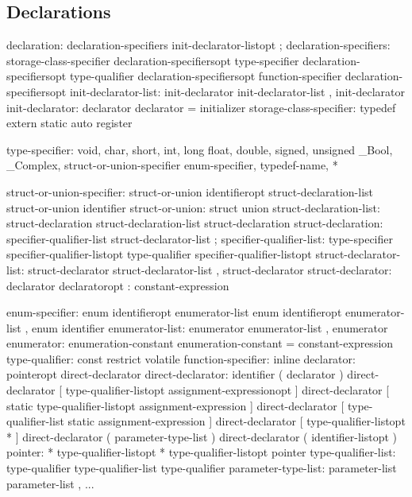 \subsection{Declarations}\label{chap:decl}
\begin{code_files}
declaration:
	declaration-specifiers init-declarator-listopt ;
declaration-specifiers:
	storage-class-specifier declaration-specifiersopt
	type-specifier declaration-specifiersopt
	type-qualifier declaration-specifiersopt
	function-specifier declaration-specifiersopt
init-declarator-list:
	init-declarator
	init-declarator-list , init-declarator
init-declarator:
	declarator
	declarator = initializer
storage-class-specifier:
	typedef
	extern
	static
	auto
	register

type-specifier:
	void, char, short, int, long
	float, double, signed, unsigned
	_Bool, _Complex, struct-or-union-specifier
	enum-specifier, typedef-name, *

struct-or-union-specifier:
	struct-or-union identifieropt { struct-declaration-list }
	struct-or-union identifier
struct-or-union:
	struct
	union
struct-declaration-list:
	struct-declaration
	struct-declaration-list struct-declaration
struct-declaration:
	specifier-qualifier-list struct-declarator-list ;
specifier-qualifier-list:
	type-specifier specifier-qualifier-listopt
	type-qualifier specifier-qualifier-listopt
struct-declarator-list:
	struct-declarator
	struct-declarator-list , struct-declarator
struct-declarator:
	declarator
	declaratoropt : constant-expression

enum-specifier:
	enum identifieropt { enumerator-list }
	enum identifieropt { enumerator-list , }
	enum identifier
enumerator-list:
	enumerator
	enumerator-list , enumerator
enumerator:
	enumeration-constant
	enumeration-constant = constant-expression
type-qualifier:
	const
	restrict
	volatile
function-specifier:
	inline
declarator:
	pointeropt direct-declarator
direct-declarator:
	identifier
	( declarator )
	direct-declarator [ type-qualifier-listopt assignment-expressionopt ]
	direct-declarator [ static type-qualifier-listopt assignment-expression ]
	direct-declarator [ type-qualifier-list static assignment-expression ]
	direct-declarator [ type-qualifier-listopt * ]
	direct-declarator ( parameter-type-list )
	direct-declarator ( identifier-listopt )
pointer:
	* type-qualifier-listopt
	* type-qualifier-listopt pointer
type-qualifier-list:
	type-qualifier
	type-qualifier-list type-qualifier
parameter-type-list:
	parameter-list
	parameter-list , ...


\end{code_files}
